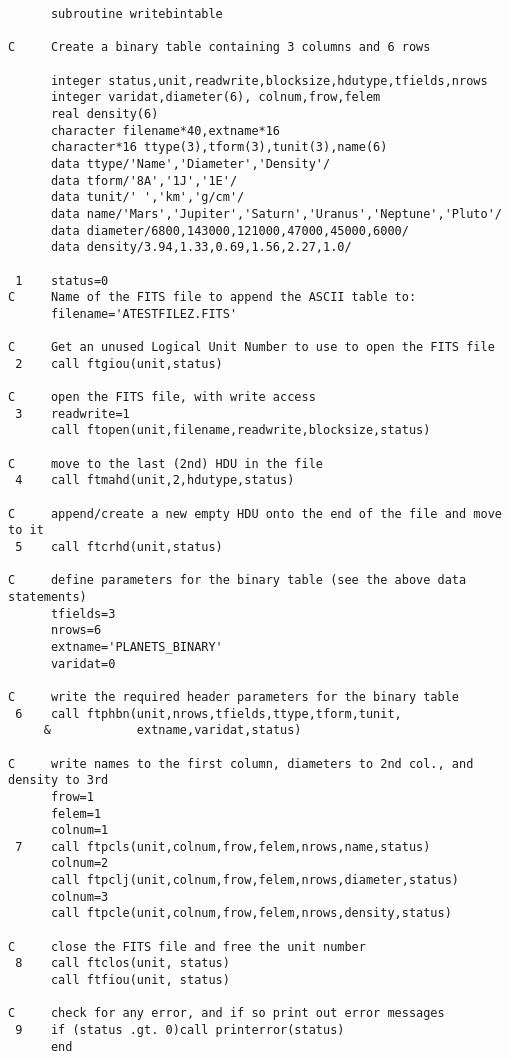 \newpage
\footnotesize
\begin{verbatim}
      subroutine writebintable

C     Create a binary table containing 3 columns and 6 rows

      integer status,unit,readwrite,blocksize,hdutype,tfields,nrows
      integer varidat,diameter(6), colnum,frow,felem
      real density(6)
      character filename*40,extname*16
      character*16 ttype(3),tform(3),tunit(3),name(6)
      data ttype/'Name','Diameter','Density'/
      data tform/'8A','1J','1E'/
      data tunit/' ','km','g/cm'/
      data name/'Mars','Jupiter','Saturn','Uranus','Neptune','Pluto'/
      data diameter/6800,143000,121000,47000,45000,6000/
      data density/3.94,1.33,0.69,1.56,2.27,1.0/

 1    status=0
C     Name of the FITS file to append the ASCII table to:
      filename='ATESTFILEZ.FITS'

C     Get an unused Logical Unit Number to use to open the FITS file
 2    call ftgiou(unit,status)

C     open the FITS file, with write access
 3    readwrite=1
      call ftopen(unit,filename,readwrite,blocksize,status)

C     move to the last (2nd) HDU in the file
 4    call ftmahd(unit,2,hdutype,status)

C     append/create a new empty HDU onto the end of the file and move to it
 5    call ftcrhd(unit,status)

C     define parameters for the binary table (see the above data statements)
      tfields=3
      nrows=6
      extname='PLANETS_BINARY'
      varidat=0
      
C     write the required header parameters for the binary table
 6    call ftphbn(unit,nrows,tfields,ttype,tform,tunit,
     &            extname,varidat,status)

C     write names to the first column, diameters to 2nd col., and density to 3rd
      frow=1
      felem=1
      colnum=1
 7    call ftpcls(unit,colnum,frow,felem,nrows,name,status)
      colnum=2
      call ftpclj(unit,colnum,frow,felem,nrows,diameter,status)  
      colnum=3
      call ftpcle(unit,colnum,frow,felem,nrows,density,status)  

C     close the FITS file and free the unit number
 8    call ftclos(unit, status)
      call ftfiou(unit, status)

C     check for any error, and if so print out error messages
 9    if (status .gt. 0)call printerror(status)
      end
\end{verbatim}
\normalsize
\newpage
